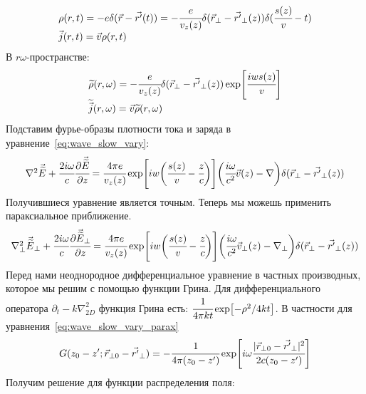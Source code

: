 \begin{equation}
	\begin{array}{lcl}
		\rho(r,t) = -e\delta(\vec{r}- \vec{r'}(t)) = -\cfrac{e}{v_z(z)}\delta(\vec{r}_{\bot}- \vec{r'}_{\bot}(z))\delta(\cfrac{s(z)}{v} - t)\\
		\vec{j}(r,t) = \vec{v}\rho(r,t)	
	\end{array}
\end{equation} 
В $r\omega$-пространстве: 
\begin{equation}
	\begin{array}{lcl}
		\widetilde{\rho}(r,\omega) = -\cfrac{e}{v_z(z)}\delta(\vec{r}_{\bot}- \vec{r'}_{\bot}(z))\exp[\cfrac{iws(z)}{v}]\\
		\widetilde{\vec{j}}(r,\omega) = \vec{v}\widetilde{\rho}(r,\omega)	
	\end{array}
\end{equation} 
Подставим фурье-образы плотности тока и заряда в уравнение~\ref{eq:wave_slow_vary}:
\begin{equation}
	\label{eq:wave_eq}
	\begin{array}{lcl}
		\nabla^2 \vec{\widetilde{E}} + \cfrac{2i\omega}{c}\cfrac{\partial\vec{\widetilde{E}}}{\partial z} = 
		\cfrac{4\pi e}{v_z(z)} \exp[iw\bigg(\cfrac{s(z)}{v} - \cfrac{z}{c}\bigg)]
		\bigg(  
			\cfrac{i\omega}{c^2}\vec{v}(z)
			-\nabla\bigg) \delta(\vec{r}_{\bot} - \vec{r'}_{\bot}(z)) 
		
	\end{array}
\end{equation} 
Получившиеся уравнение является точным. Теперь мы можешь применить параксиальное приближение. 
\begin{equation}
	\label{eq:wave_slow_vary_parax}
	\begin{array}{lcl}
		\nabla_{\bot}^2 \vec{\widetilde{E}}_{\bot} + \cfrac{2i\omega}{c}\cfrac{\partial\vec{\widetilde{E}}_{\bot}}{\partial z} = 
		\cfrac{4\pi e}{v_z(z)} \exp[iw\bigg(\cfrac{s(z)}{v} - \cfrac{z}{c}\bigg)]\bigg(  
			\cfrac{i\omega}{c^2}\vec{v}_{\bot}(z) 
			-\nabla_{\bot}\bigg) \delta(\vec{r}_{\bot} - \vec{r'}_{\bot}(z)) 
	\end{array}
\end{equation} 
Перед нами неоднородное дифференциальное уравнение в частных производных, которое мы решим с помощью функции Грина. Для дифференциального оператора $\partial_t - k\nabla_{2D}^2$ функция Грина есть: $\cfrac{1}{4\pi kt}\exp[-\rho^2/4kt]$. В частности для уравнения~\ref{eq:wave_slow_vary_parax}
\begin{equation}
	\label{eq:Green_func}
	G(z_0 - z'; \vec{r}_{\bot 0} - \vec{r'}_{\bot}) = 
	- \cfrac{1}{4\pi (z_0 - z')}\exp[i\omega \cfrac{|\vec{r}_{\bot 0} - \vec{r'}_{\bot}|^2}{2c(z_0 - z')}]
\end{equation} 
Получим решение для функции распределения поля:

